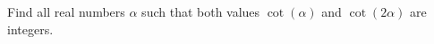 Find all real numbers $\alpha$ such that both values $\cot(\alpha)$ and $\cot(2\alpha)$ are integers.
